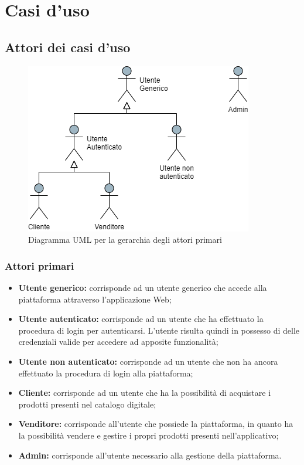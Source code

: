 \section{Casi d'uso}
\subsection{Attori dei casi d'uso}
\begin{figure}[H]
\centering
\includegraphics[scale=0.6]{res/UseCase/Immagini/DiagrammaAttoriPrimari}
\caption{Diagramma UML per la gerarchia degli attori primari}
\end{figure}
\subsubsection{Attori primari}
\begin{itemize}
\item \textbf{Utente generico:} corrisponde ad un utente generico che accede alla piattaforma attraverso l'applicazione Web;
\item \textbf{Utente autenticato:} corrisponde ad un utente che ha effettuato la procedura di login per autenticarsi. L'utente risulta quindi in possesso di delle credenziali valide per accedere ad apposite funzionalità;
\item \textbf{Utente non autenticato:} corrisponde ad un utente che non ha ancora effettuato la procedura di login alla piattaforma;
\item \textbf{Cliente:} corrisponde ad un utente che ha la possibilità di acquistare i prodotti presenti nel catalogo digitale;
\item \textbf{Venditore:} corrisponde all'utente che possiede la piattaforma, in quanto ha la possibilità vendere e gestire i propri prodotti presenti nell'applicativo;
\item \textbf{Admin:} corrisponde all'utente necessario alla gestione della piattaforma.
\end{itemize}
